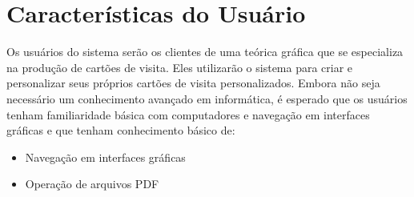 \section{Características do Usuário}

Os usuários do sistema serão os clientes de uma teórica gráfica que se especializa na produção de cartões de visita. Eles utilizarão o sistema para criar e personalizar seus próprios cartões de visita personalizados. Embora não seja necessário um conhecimento avançado em informática, é esperado que os usuários tenham familiaridade básica com computadores e navegação em interfaces gráficas e que tenham conhecimento básico de:
\begin{itemize}
    \item Navegação em interfaces gráficas
    \item Operação de arquivos PDF
\end{itemize}